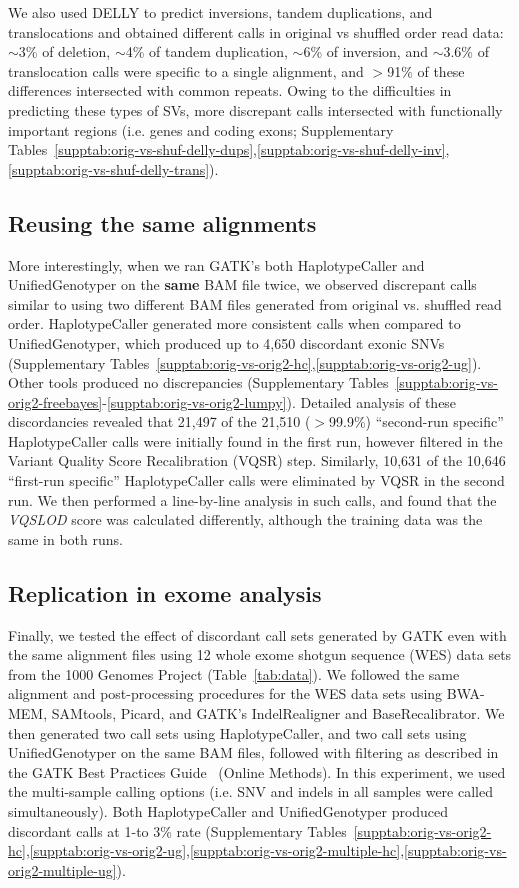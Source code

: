 \documentclass[10pt,a4paper]{article}
\begin{document}
We also used DELLY to predict inversions, tandem duplications, and translocations and obtained different calls in original vs shuffled order read data: $\sim$3\% of deletion, $\sim$4\% of tandem duplication, $\sim$6\% of inversion, and $\sim$3.6\% of translocation calls were specific to a single alignment, and $>$91\% of these differences intersected with common repeats. Owing to the difficulties in predicting
these types of SVs, more discrepant calls intersected with functionally important regions (i.e. genes and coding exons; Supplementary Tables~\ref{supptab:orig-vs-shuf-delly-dups},\ref{supptab:orig-vs-shuf-delly-inv},\ref{supptab:orig-vs-shuf-delly-trans}).

\subsection*{Reusing the same alignments}
More interestingly, when we ran GATK's both HaplotypeCaller and UnifiedGenotyper on the {\bf same} BAM file twice, we observed discrepant calls similar to using two different BAM files generated from original vs. shuffled read order. HaplotypeCaller generated more consistent calls when compared to UnifiedGenotyper, which produced up to 4,650 discordant exonic SNVs (Supplementary Tables~\ref{supptab:orig-vs-orig2-hc},\ref{supptab:orig-vs-orig2-ug}). Other tools produced no discrepancies (Supplementary Tables~\ref{supptab:orig-vs-orig2-freebayes}-\ref{supptab:orig-vs-orig2-lumpy}).
Detailed analysis of these discordancies revealed that  21,497 of the 21,510 ($>$99.9\%) ``second-run specific'' HaplotypeCaller calls were initially found in the first run, however filtered in the Variant Quality Score Recalibration (VQSR) step. Similarly, 10,631 of the 10,646 ``first-run specific'' HaplotypeCaller calls were eliminated by VQSR in the second run. We then performed a line-by-line analysis in such calls, and found that the {\it VQSLOD} score was calculated differently, although the training data was the same in both runs.

\subsection*{Replication in exome analysis}
Finally, we tested the effect of discordant call sets generated by GATK even with the same alignment files using 12 whole exome shotgun sequence (WES) data sets from the 1000 Genomes Project (Table~\ref{tab:data}). We followed the same alignment and post-processing procedures for the WES data sets using BWA-MEM, SAMtools, Picard, and GATK's IndelRealigner and BaseRecalibrator. We then generated two call sets using HaplotypeCaller, and two call sets using UnifiedGenotyper on the same BAM files, followed with filtering as described in the GATK Best Practices Guide~\cite{VanderAuwera2013} (Online Methods). In this experiment, we used the multi-sample calling options (i.e. SNV and indels in all samples were called simultaneously). Both HaplotypeCaller and UnifiedGenotyper produced discordant calls at 1-to 3\% rate
(Supplementary Tables~\ref{supptab:orig-vs-orig2-hc},\ref{supptab:orig-vs-orig2-ug},\ref{supptab:orig-vs-orig2-multiple-hc},\ref{supptab:orig-vs-orig2-multiple-ug}). 
\end{document}
